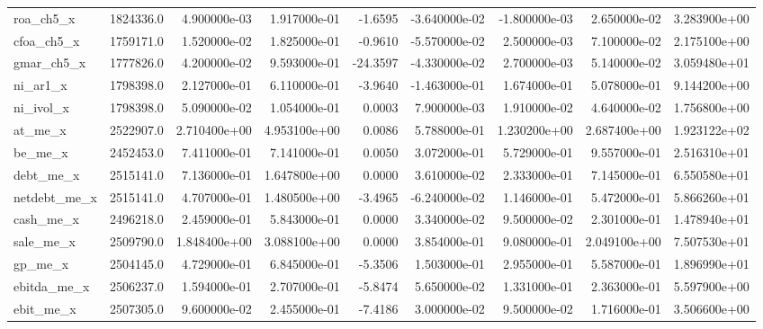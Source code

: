 \documentclass[10pt]{article}
\begin{document}
\begin{landscape}
\begin{longtable}{|l|r|r|r|r|r|r|r|r|}
roa\_ch5\_x               &  1824336.0 &  4.900000e-03 &  1.917000e-01 &     -1.6595 & -3.640000e-02 & -1.800000e-03 &  2.650000e-02 &  3.283900e+00 \\
cfoa\_ch5\_x              &  1759171.0 &  1.520000e-02 &  1.825000e-01 &     -0.9610 & -5.570000e-02 &  2.500000e-03 &  7.100000e-02 &  2.175100e+00 \\
gmar\_ch5\_x              &  1777826.0 &  4.200000e-02 &  9.593000e-01 &    -24.3597 & -4.330000e-02 &  2.700000e-03 &  5.140000e-02 &  3.059480e+01 \\
ni\_ar1\_x                &  1798398.0 &  2.127000e-01 &  6.110000e-01 &     -3.9640 & -1.463000e-01 &  1.674000e-01 &  5.078000e-01 &  9.144200e+00 \\
ni\_ivol\_x               &  1798398.0 &  5.090000e-02 &  1.054000e-01 &      0.0003 &  7.900000e-03 &  1.910000e-02 &  4.640000e-02 &  1.756800e+00 \\
at\_me\_x                 &  2522907.0 &  2.710400e+00 &  4.953100e+00 &      0.0086 &  5.788000e-01 &  1.230200e+00 &  2.687400e+00 &  1.923122e+02 \\
be\_me\_x                 &  2452453.0 &  7.411000e-01 &  7.141000e-01 &      0.0050 &  3.072000e-01 &  5.729000e-01 &  9.557000e-01 &  2.516310e+01 \\
debt\_me\_x               &  2515141.0 &  7.136000e-01 &  1.647800e+00 &      0.0000 &  3.610000e-02 &  2.333000e-01 &  7.145000e-01 &  6.550580e+01 \\
netdebt\_me\_x            &  2515141.0 &  4.707000e-01 &  1.480500e+00 &     -3.4965 & -6.240000e-02 &  1.146000e-01 &  5.472000e-01 &  5.866260e+01 \\
cash\_me\_x               &  2496218.0 &  2.459000e-01 &  5.843000e-01 &      0.0000 &  3.340000e-02 &  9.500000e-02 &  2.301000e-01 &  1.478940e+01 \\
sale\_me\_x               &  2509790.0 &  1.848400e+00 &  3.088100e+00 &      0.0000 &  3.854000e-01 &  9.080000e-01 &  2.049100e+00 &  7.507530e+01 \\
gp\_me\_x                 &  2504145.0 &  4.729000e-01 &  6.845000e-01 &     -5.3506 &  1.503000e-01 &  2.955000e-01 &  5.587000e-01 &  1.896990e+01 \\
ebitda\_me\_x             &  2506237.0 &  1.594000e-01 &  2.707000e-01 &     -5.8474 &  5.650000e-02 &  1.331000e-01 &  2.363000e-01 &  5.597900e+00 \\
ebit\_me\_x               &  2507305.0 &  9.600000e-02 &  2.455000e-01 &     -7.4186 &  3.000000e-02 &  9.500000e-02 &  1.716000e-01 &  3.506600e+00 \\

\end{longtable}
\end{landscape}
\end{document}
